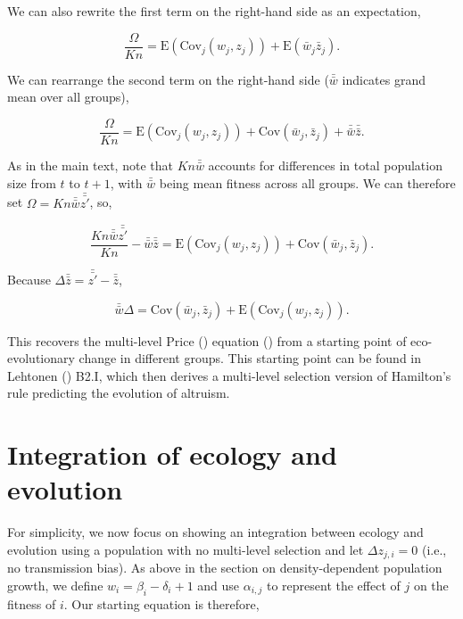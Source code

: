 \documentclass[
]{article}
\begin{document}
We can also rewrite the first term on the right-hand side as an
expectation,

\[\frac{\Omega}{K n} = \mathrm{E}\left(\mathrm{Cov}_{j}\left(w_{j}, z_{j}\right)\right) + \mathrm{E}\left(\bar{w}_{j} \bar{z}_{j} \right).\]

We can rearrange the second term on the right-hand side
(\(\bar{\bar{w}}\) indicates grand mean over all groups),

\[\frac{\Omega}{K n} = \mathrm{E}\left(\mathrm{Cov}_{j}\left(w_{j}, z_{j}\right)\right) +  \mathrm{Cov}\left(\bar{w}_{j}, \bar{z}_{j} \right) + \bar{\bar{w}}\bar{\bar{z}}.\]

As in the main text, note that \(Kn\bar{\bar{w}}\) accounts for
differences in total population size from \(t\) to \(t+1\), with
\(\bar{\bar{w}}\) being mean fitness across all groups. We can therefore
set \(\Omega = Kn\bar{\bar{w}}\bar{\bar{z'}}\), so,

\[\frac{Kn\bar{\bar{w}}\bar{\bar{z'}}}{K n} - \bar{\bar{w}}\bar{\bar{z}} = \mathrm{E}\left(\mathrm{Cov}_{j}\left(w_{j}, z_{j}\right)\right) +  \mathrm{Cov}\left(\bar{w}_{j}, \bar{z}_{j} \right).\]

Because \(\Delta \bar{\bar{z}} = \bar{\bar{z'}} - \bar{\bar{z}}\),

\[\bar{\bar{w}}\Delta = \mathrm{Cov}\left(\bar{w}_{j}, \bar{z}_{j} \right) + \mathrm{E}\left(\mathrm{Cov}_{j}\left(w_{j}, z_{j}\right)\right).
\tag{S6}
\]

This recovers the multi-level Price ()
equation () from a starting
point of eco-evolutionary change in different groups. This starting
point can be found in Lehtonen () B2.I,
which then derives a multi-level selection version of Hamilton's rule
predicting the evolution of altruism.

\section{Integration of ecology and
evolution}\label{integration-of-ecology-and-evolution}

For simplicity, we now focus on showing an integration between ecology
and evolution using a population with no multi-level selection and let
\(\Delta z_{j, i} = 0\) (i.e., no transmission bias). As above in the
section on density-dependent population growth, we define
\(w_{i} = \beta_{i} - \delta_{i} + 1\) and use \(\alpha_{i,j}\) to
represent the effect of \(j\) on the fitness of \(i\). Our starting
equation is therefore,
\end{document}
